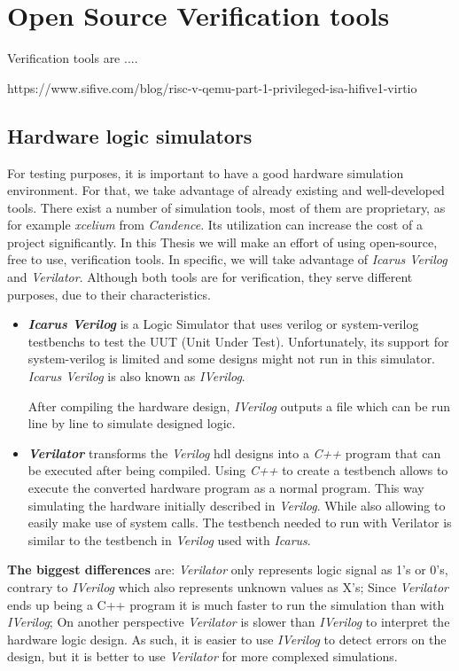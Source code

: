 \section{Open Source Verification tools}
\label{section:verification_tools}
Verification tools are ....

https://www.sifive.com/blog/risc-v-qemu-part-1-privileged-isa-hifive1-virtio

\subsection{Hardware logic simulators}
For testing purposes, it is important to have a good hardware simulation environment. For that, we take advantage of already existing and well-developed tools. There exist a number of simulation tools, most of them are proprietary, as for example \textit{xcelium} from \textit{Candence}. Its utilization can increase the cost of a project significantly. In this Thesis we will make an effort of using open-source, free to use, verification tools. In specific, we will take advantage of \textit{Icarus Verilog} and \textit{Verilator}. Although both tools are for verification, they serve different purposes, due to their characteristics.

\begin{itemize}
    \item \textbf{\textit{Icarus Verilog}} is a Logic Simulator that uses verilog or system-verilog testbenchs to test the UUT (Unit Under Test). Unfortunately, its support for system-verilog is limited and some designs might not run in this simulator. \textit{Icarus Verilog} is also known as \textit{IVerilog}.
    
    After compiling the hardware design, \textit{IVerilog} outputs a file which can be run line by line to simulate designed logic.
    
    \item \textbf{\textit{Verilator}} transforms the \textit{Verilog} \acrshort{hdl} designs into a \textit{C++} program that can be executed after being compiled. Using \textit{C++} to create a testbench allows to execute the converted hardware program as a normal program. This way simulating the hardware initially described in \textit{Verilog}. While also allowing to easily make use of system calls. The testbench needed to run with Verilator is similar to the testbench in \textit{Verilog} used with \textit{Icarus}.
\end{itemize}

\textbf{The biggest differences} are: \textit{Verilator} only represents logic signal as 1's or 0's, contrary to \textit{IVerilog} which also represents unknown values as X's; Since \textit{Verilator} ends up being a C++ program it is much faster to run the simulation than with \textit{IVerilog}; On another perspective \textit{Verilator} is slower than \textit{IVerilog} to interpret the hardware logic design.
As such, it is easier to use \textit{IVerilog} to detect errors on the design, but it is better to use \textit{Verilator} for more complexed simulations.

